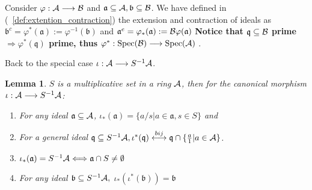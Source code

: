 \documentclass[11pt]{article}
\newtheorem{lemma}[thm]{Lemma}
\newcommand{\sca}{{\mathfrak a}}
\newcommand{\scb}{{\mathfrak b}}
\newcommand{\scq}{\mathfrak q}
\newcommand{\cala}{{\cal A}}
\newcommand{\calb}{{\cal B}}
\newcommand{\Lrta}{\Longrightarrow}
\newcommand{\lrta}{\longrightarrow}
\newcommand{\llrta}{\longleftrightarrow}
\newcommand{\Llrta}{\Longleftrightarrow}
\begin{document}
Consider $\varphi:\cala\lrta\calb$ and $\sca\subseteq \cala, \scb\subseteq \calb$. We have defined in (~\ref{def:extention_contraction}) the extension and contraction of ideals as $\scb^{c}=\varphi^{*}(\sca):=\varphi^{-1}(\scb)$ and $\sca^{e}=\varphi_*(\sca):=\calb\varphi(\sca)$ \textbf{Notice that 
$\scq\subseteq \calb$ prime $\Lrta \varphi^{*}(\scq)$ prime,
thus $\varphi^*:\text{Spec}(\calb)\lrta \text{Spec}(\cala)$
}.

Back to the special case $\iota :\cala\lrta S^{-1}\cala$.
\begin{lemma}\label{lem:prep_localization_iso}
$S$ is a multiplicative set in a ring $\cala$, then for the canonical morphism $\iota:\cala\lrta S^{-1}\cala$:
\begin{enumerate}[label=(\alph*)]
\item For any ideal $\sca\subseteq \cala$, $\iota_*(\sca)=\{a/s|a\in\sca,s\in S\}$ and 
\item {\color{red} For a general ideal $ \scq\subseteq S^{-1}\cala,\iota^*(\scq)\overset{bij}{\llrta}\scq\cap \{\frac{a}{1}|a\in\cala\}$}.
\item $\iota_*(\sca)= S^{-1}\cala\Llrta\sca\cap S\neq \emptyset$
\item For any ideal $\scb\subseteq S^{-1}\cala,$ $\iota_{*}(\iota^*(\scb))=\scb$
\end{enumerate}
\end{lemma}
\end{document}
